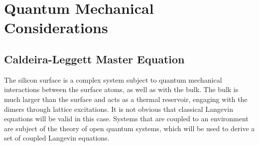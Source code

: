 	\section{Quantum Mechanical Considerations}
	\subsection{Caldeira-Leggett Master Equation}
	The silicon surface is a complex system subject to quantum mechanical interactions between the surface atoms, as well as with the bulk. The bulk is much larger than the surface and acts as a thermal reservoir, engaging with the dimers through lattice excitations. It is not obvious that classical Langevin equations will be valid in this case. Systems that are coupled to an environment are subject of the theory of open quantum systems, which will be used to derive a set of coupled Langevin equations. \\
	
